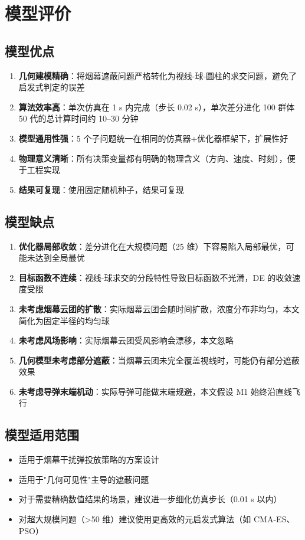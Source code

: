 \section{模型评价}
\subsection{模型优点}

\begin{enumerate}
  \item \textbf{几何建模精确}：将烟幕遮蔽问题严格转化为视线-球-圆柱的求交问题，避免了启发式判定的误差
  \item \textbf{算法效率高}：单次仿真在 1 s 内完成（步长 0.02 s），单次差分进化 100 群体 50 代的总计算时间约 10--30 分钟
  \item \textbf{模型通用性强}：5 个子问题统一在相同的仿真器+优化器框架下，扩展性好
  \item \textbf{物理意义清晰}：所有决策变量都有明确的物理含义（方向、速度、时刻），便于工程实现
  \item \textbf{结果可复现}：使用固定随机种子，结果可复现
\end{enumerate}

\subsection{模型缺点}

\begin{enumerate}
  \item \textbf{优化器局部收敛}：差分进化在大规模问题（25 维）下容易陷入局部最优，可能未达到全局最优
  \item \textbf{目标函数不连续}：视线-球求交的分段特性导致目标函数不光滑，DE 的收敛速度受限
  \item \textbf{未考虑烟幕云团的扩散}：实际烟幕云团会随时间扩散，浓度分布非均匀，本文简化为固定半径的均匀球
  \item \textbf{未考虑风场影响}：实际烟幕云团受风影响会漂移，本文忽略
  \item \textbf{几何模型未考虑部分遮蔽}：当烟幕云团未完全覆盖视线时，可能仍有部分遮蔽效果
  \item \textbf{未考虑导弹末端机动}：实际导弹可能做末端规避，本文假设 M1 始终沿直线飞行
\end{enumerate}

\subsection{模型适用范围}

\begin{itemize}
  \item 适用于烟幕干扰弹投放策略的方案设计
  \item 适用于"几何可见性"主导的遮蔽问题
  \item 对于需要精确数值结果的场景，建议进一步细化仿真步长（0.01 s 以内）
  \item 对超大规模问题（>50 维）建议使用更高效的元启发式算法（如 CMA-ES、PSO）
\end{itemize}
